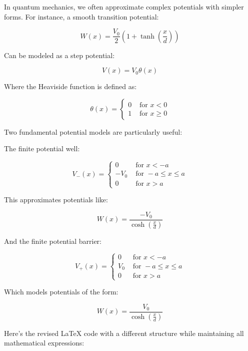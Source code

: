 \documentclass[italian]{HKNdocument}
\begin{document}
In quantum mechanics, we often approximate complex potentials with simpler forms. For instance, a smooth transition potential:

\begin{equation}
W(x)=\frac{V_{0}}{2}\left(1+\tanh \left(\frac{x}{d}\right)\right) \label{eq:6.1}
\end{equation}

Can be modeled as a step potential:

\begin{equation}
V(x)=V_{0} \theta(x) \label{eq:6.2}
\end{equation}

Where the Heaviside function is defined as:

\[
\theta(x)= \begin{cases}0 & \text { for } x<0  \label{eq:6.3}\\ 1 & \text { for } x \geq 0\end{cases}
\]

Two fundamental potential models are particularly useful:

The finite potential well:

\[
V_{-}(x)= \begin{cases}0 & \text { for } x<-a  \label{eq:6.4}\\ -V_{0} & \text { for }-a \leq x \leq a \\ 0 & \text { for } x>a\end{cases}
\]

This approximates potentials like:

\begin{equation}
W(x)=\frac{-V_{0}}{\cosh \left(\frac{x}{d}\right)} \label{eq:6.5}
\end{equation}

And the finite potential barrier:

\[
V_{+}(x)= \begin{cases}0 & \text { for } x<-a  \label{eq:6.6}\\ V_{0} & \text { for }-a \leq x \leq a \\ 0 & \text { for } x>a\end{cases}
\]

Which models potentials of the form:

\begin{equation}
W(x)=\frac{V_{0}}{\cosh \left(\frac{x}{d}\right)} \label{eq:6.7}
\end{equation}

Here's the revised LaTeX code with a different structure while maintaining all mathematical expressions:
\end{document}
